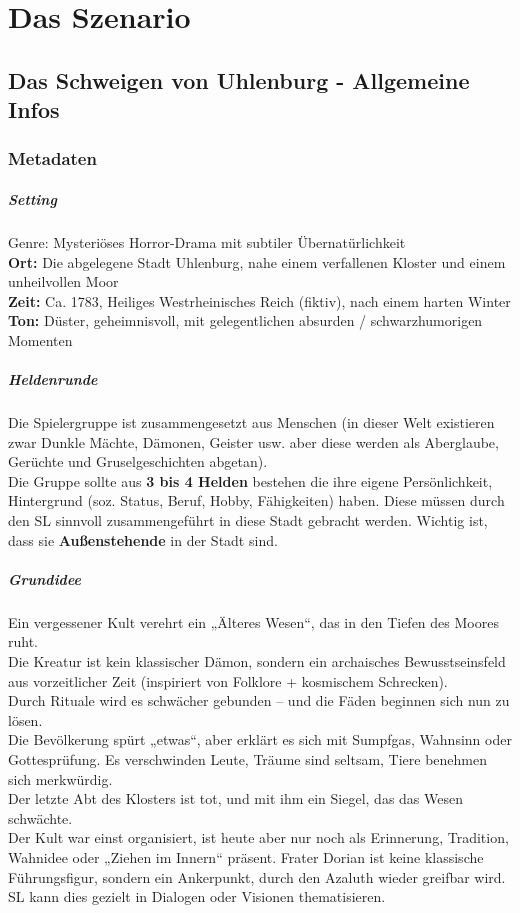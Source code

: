 \chapter{Das Szenario}
\section{Das Schweigen von Uhlenburg - Allgemeine Infos}
\subsection{Metadaten}
\paragraph{Setting}
Genre: Mysteriöses Horror-Drama mit subtiler Übernatürlichkeit\\
\textbf{Ort:} Die abgelegene Stadt Uhlenburg, nahe einem verfallenen Kloster und einem unheilvollen Moor\\
\textbf{Zeit:} Ca. 1783, Heiliges Westrheinisches Reich (fiktiv), nach einem harten Winter\\
\textbf{Ton:} Düster, geheimnisvoll, mit gelegentlichen absurden / schwarzhumorigen Momenten
\paragraph{Heldenrunde}
Die Spielergruppe ist zusammengesetzt aus Menschen (in dieser Welt existieren zwar Dunkle Mächte, Dämonen, Geister usw. aber diese werden als Aberglaube, Gerüchte und Gruselgeschichten abgetan).\\
Die Gruppe sollte aus \textbf{3 bis 4 Helden} bestehen die ihre eigene Persönlichkeit, Hintergrund (soz. Status, Beruf, Hobby, Fähigkeiten) haben. Diese müssen durch den SL sinnvoll zusammengeführt in diese Stadt gebracht werden. Wichtig ist, dass sie \textbf{Außenstehende} in der Stadt sind.
\paragraph{Grundidee}
Ein vergessener Kult verehrt ein „Älteres Wesen“, das in den Tiefen des Moores ruht. \\
Die Kreatur ist kein klassischer Dämon, sondern ein archaisches Bewusstseinsfeld aus vorzeitlicher Zeit (inspiriert von Folklore + kosmischem Schrecken).\\
Durch Rituale wird es schwächer gebunden – und die Fäden beginnen sich nun zu lösen.\\
Die Bevölkerung spürt „etwas“, aber erklärt es sich mit Sumpfgas, Wahnsinn oder Gottesprüfung. Es verschwinden Leute, Träume sind seltsam, Tiere benehmen sich merkwürdig.\\
Der letzte Abt des Klosters ist tot, und mit ihm ein Siegel, das das Wesen schwächte.\\
Der Kult war einst organisiert, ist heute aber nur noch als Erinnerung, Tradition, Wahnidee oder „Ziehen im Innern“ präsent. Frater Dorian ist keine klassische Führungsfigur, sondern ein Ankerpunkt, durch den Azaluth wieder greifbar wird. SL kann dies gezielt in Dialogen oder Visionen thematisieren.
